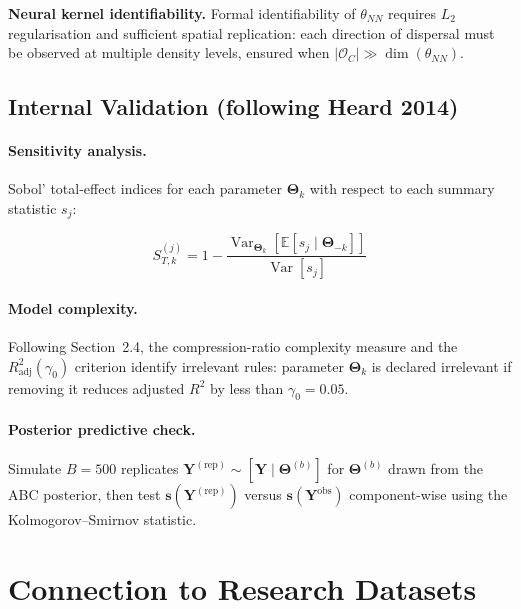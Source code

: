 \documentclass[12pt,a4paper]{article}
\theoremstyle{definition}
\newcommand{\E}{\mathbb{E}}
\newcommand{\Var}{\operatorname{Var}}
\newcommand{\bs}{\bm{s}}
\newcommand{\bTheta}{\bm{\Theta}}
\newcommand{\OC}{\mathcal{O}_C}
\begin{document}
\noindent\textbf{Neural kernel identifiability.}
Formal identifiability of $\theta_{NN}$ requires $L_2$ regularisation and
sufficient spatial replication: each direction of dispersal must be observed
at multiple density levels, ensured when $|\OC| \gg \dim(\theta_{NN})$.

\subsection{Internal Validation (following Heard 2014)}

\paragraph{Sensitivity analysis.}
Sobol' total-effect indices for each parameter $\bTheta_k$ with respect to
each summary statistic $s_j$:

\begin{equation}
  S_{T,k}^{(j)}
  = 1 - \frac{\Var_{\bTheta_k}\!\left[\E[s_j \mid \bTheta_{-k}]\right]}
             {\Var[s_j]}
  \label{eq:sobol}
\end{equation}

\paragraph{Model complexity.}
Following \citet{heard2014} Section~2.4, the compression-ratio complexity
measure and the $R^2_{\mathrm{adj}}(\gamma_0)$ criterion identify irrelevant
rules: parameter $\bTheta_k$ is declared irrelevant if removing it reduces
adjusted $R^2$ by less than $\gamma_0 = 0.05$.

\paragraph{Posterior predictive check.}
Simulate $B=500$ replicates $\mathbf{Y}^{(\mathrm{rep})} \sim [\mathbf{Y}\mid\bTheta^{(b)}]$
for $\bTheta^{(b)}$ drawn from the ABC posterior, then test
$\bs(\mathbf{Y}^{(\mathrm{rep})})$ versus $\bs(\mathbf{Y}^{\mathrm{obs}})$
component-wise using the Kolmogorov--Smirnov statistic.

\section{Connection to Research Datasets}
\label{sec:data}
\end{document}
